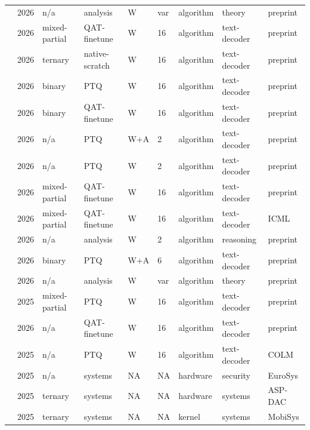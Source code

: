 \documentclass[11pt]{article}
\begin{document}
\begin{landscape}
\begin{longtable}{p{3.2cm} p{1cm} p{1.9cm} p{2.2cm} p{2.2cm} p{1.3cm} p{2.2cm} p{2.1cm} p{2.5cm}}
\citet{Anon2026-ExpressivePowerWQ} & 2026 & n/\allowbreak{}a & analysis & W & var & algorithm & theory & preprint \\
\citet{Wang2026-HESTIA} & 2026 & mixed-partial & QAT-finetune & W & 16 & algorithm & text-decoder & preprint \\
\citet{Anon2026-HGF} & 2026 & ternary & native-scratch & W & 16 & algorithm & text-decoder & preprint \\
\citet{Chong2026-NanoQuant} & 2026 & binary & PTQ & W & 16 & algorithm & text-decoder & preprint \\
\citet{You2026-RaBiT} & 2026 & binary & QAT-finetune & W & 16 & algorithm & text-decoder & preprint \\
\citet{Zagitov2026-HARP} & 2026 & n/\allowbreak{}a & PTQ & W+\allowbreak{}A & 2 & algorithm & text-decoder & preprint \\
\citet{Pavlov2026-InfluenceRotations} & 2026 & n/\allowbreak{}a & PTQ & W & 2 & algorithm & text-decoder & preprint \\
\citet{Zhang2026-pQuant} & 2026 & mixed-partial & QAT-finetune & W & 16 & algorithm & text-decoder & preprint \\
\citet{Wang2026-LCQAT} & 2026 & mixed-partial & QAT-finetune & W & 16 & algorithm & text-decoder & ICML \\
\citet{Alimaskina2026-ExtremeReasoning} & 2026 & n/\allowbreak{}a & analysis & W & 2 & algorithm & reasoning & preprint \\
\citet{Zhao2026-BWLA} & 2026 & binary & PTQ & W+\allowbreak{}A & 6 & algorithm & text-decoder & preprint \\
\citet{Xu2026-FittingNotEnough} & 2026 & n/\allowbreak{}a & analysis & W & var & algorithm & theory & preprint \\
\citet{Wang2025-Fairy2i} & 2025 & mixed-partial & PTQ & W & 16 & algorithm & text-decoder & preprint \\
\citet{Maskey2026-1BitWonder} & 2026 & n/\allowbreak{}a & QAT-finetune & W & 16 & algorithm & text-decoder & preprint \\
\citet{Li2025-ICQuant} & 2025 & n/\allowbreak{}a & PTQ & W & 16 & algorithm & text-decoder & COLM \\
\citet{Wang2025-TZLLM} & 2025 & n/\allowbreak{}a & systems & NA & NA & hardware & security & Euro\allowbreak{}Sys \\
\citet{Shan2025-Platinum} & 2025 & ternary & systems & NA & NA & hardware & systems & ASP-DAC \\
\citet{Li2025-VecLUT} & 2025 & ternary & systems & NA & NA & kernel & systems & Mobi\allowbreak{}Sys \\

\end{longtable}
\end{landscape}
\end{document}
